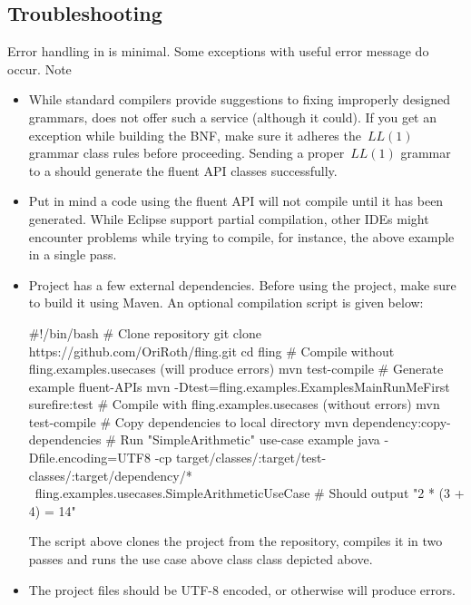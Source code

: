\documentclass[a4paper,UKenglish,cleveref, autoref]{darts-v2019}
\begin{document}
\begin{content}
\subsection{Troubleshooting}
Error handling in \Fling is minimal. Some exceptions with useful error message
do occur.
Note
\begin{itemize}
	\item While standard compilers provide suggestions to fixing improperly designed
	grammars, \Fling does not offer such a service (although it could). If you get
	an exception while building the BNF, make sure it adheres the~$LL(1)$ grammar
	class rules before proceeding. Sending a proper~$LL(1)$ grammar to a 
	should generate the fluent API classes successfully.
	\item Put in mind a code using the fluent API will not compile until it has been
	generated. While Eclipse support partial compilation, other IDEs might encounter
	problems while trying to compile, for instance, the above example in a single pass.
	\item Project \Fling has a few external dependencies. Before using the project,
	make sure to build it using Maven. An optional compilation script is given below:
	\begin{excerpt*}
#!/bin/bash
# Clone repository
git clone https://github.com/OriRoth/fling.git
cd fling
# Compile without fling.examples.usecases (will produce errors)
mvn test-compile
# Generate example fluent-APIs
mvn -Dtest=fling.examples.ExamplesMainRunMeFirst surefire:test
# Compile with fling.examples.usecases (without errors)
mvn test-compile
# Copy dependencies to local directory
mvn dependency:copy-dependencies
# Run "SimpleArithmetic" use-case example
java -Dfile.encoding=UTF8 -cp target/classes/:target/test-classes/:target/dependency/* \
fling.examples.usecases.SimpleArithmeticUseCase
# Should output "2 * (3 + 4) = 14"
	\end{excerpt*}

The script above clones the project from the repository, compiles it in two
passes and runs the use case above class \cc{SimpleArithmeticUseCase} class
depicted above.
	\item The project files should be UTF-8 encoded, or otherwise will produce errors.
\end{itemize}


\end{content}
\end{document}
